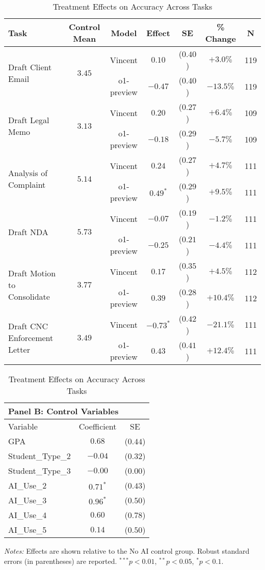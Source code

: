 \begin{table}[!htbp]
\centering
\caption{Treatment Effects on Accuracy Across Tasks}
\label{tab:accuracy_effects_controls}
\vspace{0.3cm}
\begin{tabular}{lcccccc}
\hline\hline
Task & Control Mean & Model & Effect & SE & \% Change & N \\
\hline
\multirow{2}{*}{Draft Client Email} & \multirow{2}{*}{$3.45$} & Vincent & $0.10$ & ($0.40$) & $+3.0\%$ & 119 \\
& & o1-preview & $-0.47$ & ($0.40$) & $-13.5\%$ & 119 \\
\hline
\multirow{2}{*}{Draft Legal Memo} & \multirow{2}{*}{$3.13$} & Vincent & $0.20$ & ($0.27$) & $+6.4\%$ & 109 \\
& & o1-preview & $-0.18$ & ($0.29$) & $-5.7\%$ & 109 \\
\hline
\multirow{2}{*}{Analysis of Complaint} & \multirow{2}{*}{$5.14$} & Vincent & $0.24$ & ($0.27$) & $+4.7\%$ & 111 \\
& & o1-preview & $0.49^{*}$ & ($0.29$) & $+9.5\%$ & 111 \\
\hline
\multirow{2}{*}{Draft NDA} & \multirow{2}{*}{$5.73$} & Vincent & $-0.07$ & ($0.19$) & $-1.2\%$ & 111 \\
& & o1-preview & $-0.25$ & ($0.21$) & $-4.4\%$ & 111 \\
\hline
\multirow{2}{*}{Draft Motion to Consolidate} & \multirow{2}{*}{$3.77$} & Vincent & $0.17$ & ($0.35$) & $+4.5\%$ & 112 \\
& & o1-preview & $0.39$ & ($0.28$) & $+10.4\%$ & 112 \\
\hline
\multirow{2}{*}{Draft CNC Enforcement Letter} & \multirow{2}{*}{$3.49$} & Vincent & $-0.73^{*}$ & ($0.42$) & $-21.1\%$ & 111 \\
& & o1-preview & $0.43$ & ($0.41$) & $+12.4\%$ & 111 \\
\hline
\hline\hline
\end{tabular}

\vspace{0.5cm}

\begin{tabular}{lcc}
\multicolumn{3}{l}{\textbf{Panel B: Control Variables}} \\
\hline\hline
Variable & Coefficient & SE \\
\hline
GPA & $0.68$ & ($0.44$) \\
Student_Type_2 & $-0.04$ & ($0.32$) \\
Student_Type_3 & $-0.00$ & ($0.00$) \\
AI_Use_2 & $0.71^{*}$ & ($0.43$) \\
AI_Use_3 & $0.96^{*}$ & ($0.50$) \\
AI_Use_4 & $0.60$ & ($0.78$) \\
AI_Use_5 & $0.14$ & ($0.50$) \\
\hline
\end{tabular}
\begin{tablenotes}
\small
\item \textit{Notes:} Effects are shown relative to the No AI control group. Robust standard errors (in parentheses) are reported. $^{***}p<0.01$, $^{**}p<0.05$, $^{*}p<0.1$.
\end{tablenotes}
\end{table}